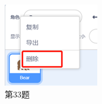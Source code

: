 \documentclass[10.5pt, a4paper]{article}
\begin{document}
\begin{figure}[htbp]
\begin{minipage}[t]{.13\textwidth}
            \includegraphics[width=\textwidth]{33.png}
            \caption*{第33题}
        \end{minipage}
    \end{figure}
\end{document}
